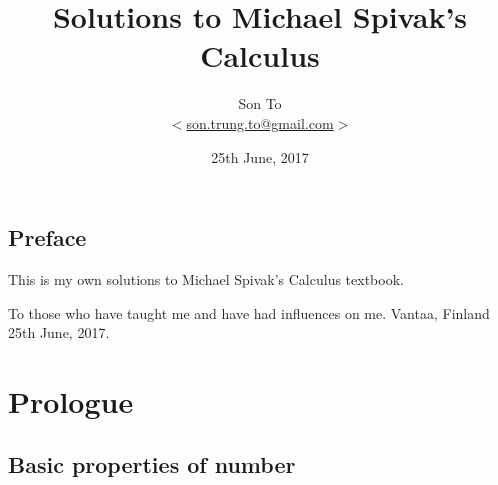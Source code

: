 \documentclass[a4paper,11pt]{memoir}
\theoremstyle{plain} \newtheorem{id}{Lemma}
\theoremstyle{definition} \newtheorem{pr}{Problem}[chapter]
\theoremstyle{remark}\newtheorem*{ab}{Remark}
\begin{document}
  \title{Solutions to Michael Spivak's Calculus}
  \author{Son To\\
  $<$\href{mailto:son.trung.to@gmail.com}%
  {son.trung.to@gmail.com}$>$}
  \date{25th June, 2017}

  \maketitle
  \makeatletter
  \def\cleardoublepage{\clearpage\if@twoside
  \ifodd\c@page\else
    \hbox{}
    \vspace*{\fill}
    \begin{center}
      \doublenote
    \end{center}
    \vspace*{\fill}
    \thispagestyle{empty}
    \newpage
    \if@twocolumn\hbox{}\newpage\fi\fi\fi
}
\newcommand{\mylabel}[2]{#2\def\@currentlabel{#2}\label{#1}}
\def\@endpart{\vfill\newpage
              \if@twoside
                \if@openright
                  \null
                  \thispagestyle{empty}%
\vspace*{\fill}%
\begin{quote}%
  \partnote
\end{quote}%
\vspace*{\fill}%
                  \newpage
                \fi
              \fi
              \if@tempswa
                \twocolumn
              \fi
}
\newcommand{\partnote}{}
\newcommand{\doublenote}{}
\makeatother

\renewcommand{\doublenote}{This page is
intentionally left blank}
\frontmatter
  \chapter{Preface}
    This is my own solutions to Michael Spivak's Calculus
    textbook.

    \medskip
    To those who have taught me and have had influences
    on me.
    \flushright
    Vantaa, Finland \\
    25th June, 2017.
  \clearpage
  \tableofcontents

\mainmatter
  \renewcommand{\partnote}{
    I held every man a debtor\\
    to his profession\ldots
    \flushright
    Francis Bacon.
  }
  \part{Prologue}
    \chapter{Basic properties of number}
    
\end{document}
